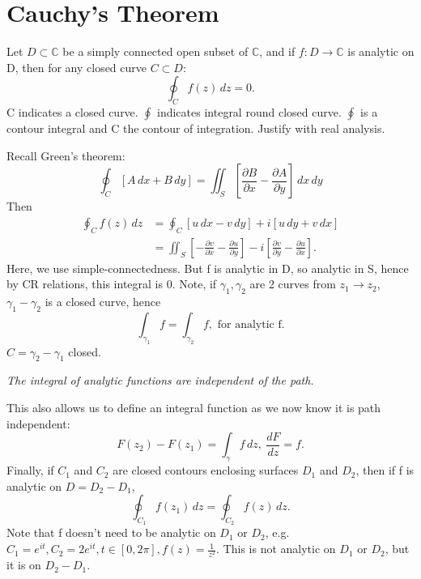 \documentclass[a4paper, 11pt, normalem]{report}
\newcommand\C{\mathbb{C}}
\newcommand\p{\partial}
\begin{document}
\section{Cauchy's Theorem}
Let $D \subset \C$ be a simply connected open subset of $\C$, and if $f: D \to \C$ is analytic on D, then for any closed curve $C \subset D$:
\begin{equation}
    \oint_C f(z)\,dz = 0.
\end{equation}
C indicates a closed curve. $\oint$ indicates integral round closed curve.
$\oint$ is a contour integral and C the contour of integration. 
Justify with real analysis. 

Recall Green's theorem:
\begin{equation}
    \oint_C \left[A\,dx + B\,dy\right] = \iint_S \left[\frac{\p B}{\p x} - \frac{\p A}{\p y}\right]\,dx\,dy
\end{equation}
Then 
\begin{align}
    \oint_C f(z)\,dz &= \oint_C [u\,dx - v\,dy] + i[u\,dy + v\,dx] \\
                     &= \iint_S \left[-\frac{\p v}{\p x} - \frac{\p u}{\p y}\right] - i\left[\frac{\p v}{\p y} - \frac{\p u}{\p x}\right].
\end{align}
Here, we use simple-connectedness.
But f is analytic in D, so analytic in S, hence by CR relations, this integral is 0. 
Note, if $\gamma_1,\gamma_2$ are 2 curves from $z_1 \to z_2$, $\gamma_1 - \gamma_2$ is a closed curve, hence
\begin{equation}
    \int_{\gamma_1} f = \int_{\gamma_2} f, \text{ for analytic f.}
\end{equation}
$C = \gamma_2 - \gamma_1$ closed. 

\emph{The integral of analytic functions are independent of the path.}

This also allows us to define an integral function as we now know it is path independent:
\begin{equation}
    F(z_2) - F(z_1) = \int_\gamma f\,dz,~ \frac{dF}{dz} = f.
\end{equation}
Finally, if $C_1$ and $C_2$ are closed contours enclosing surfaces $D_1$ and $D_2$, then if f is analytic on $D = D_2 - D_1$,
\begin{equation}
    \oint_{C_1} f(z_1)\,dz = \oint_{C_2}f(z)\,dz.
\end{equation}
Note that f doesn't need to be analytic on $D_1$ or $D_2$, e.g. $C_1 = e^{it}, C_2 = 2e^{it}, t \in [0,2\pi], f(z) = \frac{1}{z^2}$. This is not analytic on $D_1$ or $D_2$, but it is on $D_2 - D_1$.
\end{document}
